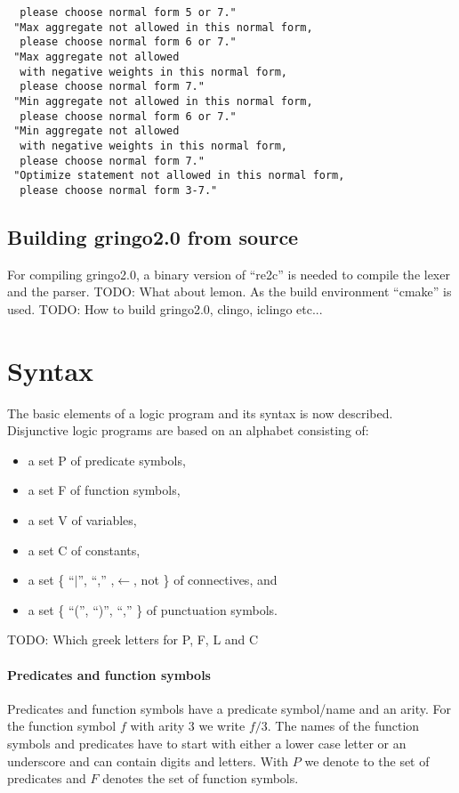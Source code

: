 \documentclass[a4paper,10pt]{article}
\begin{document}
\begin{itemize}
\begin{verbatim}
  please choose normal form 5 or 7."
 "Max aggregate not allowed in this normal form,
  please choose normal form 6 or 7."
 "Max aggregate not allowed
  with negative weights in this normal form,
  please choose normal form 7."
 "Min aggregate not allowed in this normal form,
  please choose normal form 6 or 7."
 "Min aggregate not allowed 
  with negative weights in this normal form,
  please choose normal form 7."
 "Optimize statement not allowed in this normal form,
  please choose normal form 3-7."
\end{verbatim}
\end{itemize}


\subsection{Building gringo2.0 from source}
For compiling gringo2.0, a binary version of ``re2c'' is needed to compile the lexer and the parser.
TODO: What about lemon.
As the build environment ``cmake'' is used.
TODO: How to build gringo2.0, clingo, iclingo etc...

\section{Syntax}
The basic elements of a logic program and its syntax is now described.
Disjunctive logic programs are based on an alphabet \cite{syntax} consisting of:
\begin{itemize}
\item a set P of predicate symbols,
\item a set F of function symbols,
\item a set V of variables,
\item a set C of constants,
\item a set \{ ``$\mid$'', ``,'' ,$\leftarrow$, not \} of connectives, and
\item a set \{ ``('', ``)'', ``,'' \} of punctuation symbols.
\end{itemize}



TODO: Which greek letters for P, F, L and C
\paragraph{Predicates and function symbols}
Predicates and function symbols have a predicate symbol/name and an arity.
For the function symbol $f$ with arity 3 we write $f/3$.
The names of the function symbols and predicates have to start with either a lower case letter or an underscore and can contain digits and letters.
With $P$ we denote to the set of predicates and $F$ denotes the set of function symbols.
\end{document}
